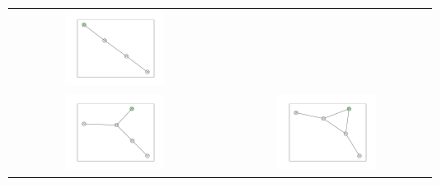 \documentclass[12pt, a4paper]{extarticle}
\begin{document}
\begin{figure}
\begin{tabularx}{\textwidth}{cc}
\includegraphics[width=0.5\textwidth]{task11-graphlets/4_14-16-18-23.pdf} \\
\includegraphics[width=0.5\textwidth]{task11-graphlets/5_16-17-18-22-23.pdf} &
\includegraphics[width=0.5\textwidth]{task11-graphlets/5_21-25-22-23-26.pdf} \\
\end{tabularx}\end{figure}
\end{document}
